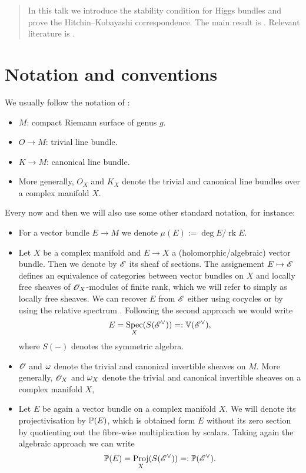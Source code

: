 \documentclass[A4paper, 12pt, british, reqno]{amsart}
\DeclareMathOperator{\Spec}{Spec}
\DeclareMathOperator{\Proj}{Proj}
\DeclareMathOperator{\rk}{rk}
\newcommand{\dual}{^{\vee}}
\begin{document}
\maketitle

\begin{abstract}
    In this talk we introduce the stability condition for Higgs bundles and prove the Hitchin--Kobayashi correspondence.
    The main result is \cite[Theorem 4.3]{hit87a}.
    Relevant literature is \cite[\S 3 and \S 4]{hit87a}.
\end{abstract}

\tableofcontents

\section*{Notation and conventions}

We usually follow the notation of \cite{hit87a}:
\begin{itemize}
    \item $M$: compact Riemann surface of genus $g$.
    \item $O\to M$: trivial line bundle.
    \item $K\to M$: canonical line bundle.
    \item More generally, $O_{X}$ and $K_{X}$ denote the trivial and canonical line bundles over a complex manifold $X$.
\end{itemize}
Every now and then we will also use some other standard notation, for instance:
\begin{itemize}
    \item For a vector bundle $E\to M$ we denote $\mu(E):=\deg{E}/\rk{E}$.
    \item Let $X$ be a complex manifold and $E\to X$ a (holomorphic/algebraic) vector bundle.
	Then we denote by $\E$ its sheaf of sections.
	The assignement $E\mapsto \E$ defines an equivalence of categories between vector bundles on $X$ and locally free sheaves of $\O_{X}$-modules of finite rank, which we will refer to simply as locally free sheaves.
	We can recover $E$ from $\E$ either using cocycles \cite[Lemma 4.8]{voi02} or by using the relative spectrum \cite[Exercise II.5.18]{har77}.
	Following the second approach we would write
	\[ E=\Spec_{X}(S(\E\dual))=:\V(\E\dual), \]
	where $S(-)$ denotes the symmetric algebra.
    \item $\O$ and $\w$ denote the trivial and canonical invertible sheaves on $M$.
	More generally, $\O_{X}$ and $\w_{X}$ denote the trivial and canonical invertible sheaves on a complex manifold $X$,
    \item Let $E$ be again a vector bundle on a complex manifold $X$.
	We will denote its projectivisation by $\P(E)$, which is obtained form $E$ without its zero section by quotienting out the fibre-wise multiplication by scalars.
	Taking again the algebraic approach we can write
	\[ \P(E)=\Proj_{X}(S(\E\dual))=:\P(\E\dual). \]
\end{itemize}
\end{document}
